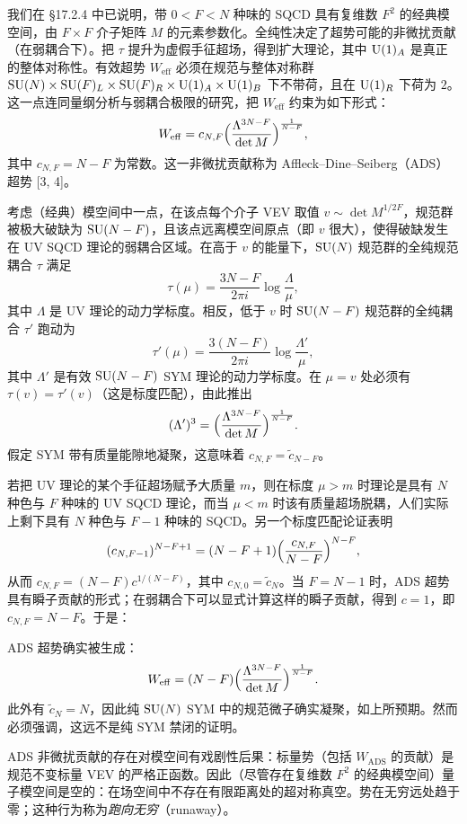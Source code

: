 我们在 §17.2.4 中已说明，带 $0<F<N$ 种味的 SQCD 具有复维数 $F^2$ 的经典模空间，由 $F\times F$ 介子矩阵 $M$ 的元素参数化。全纯性决定了超势可能的非微扰贡献（在弱耦合下）。把 $\tau$ 提升为虚假手征超场，得到扩大理论，其中 $\operatorname{U}(1)_A$ 是真正的整体对称性。有效超势 $W_{\mathrm{eff}}$ 必须在规范与整体对称群 $\operatorname{SU}(N)\times\operatorname{SU}(F)_L\times\operatorname{SU}(F)_R\times\operatorname{U}(1)_A\times\operatorname{U}(1)_B$ 下不带荷，且在 $\operatorname{U}(1)_R$ 下荷为 $2$。这一点连同量纲分析与弱耦合极限的研究，把 $W_{\mathrm{eff}}$ 约束为如下形式：
\[
W_{\mathrm{eff}}=c_{N,F}\Bigl(\frac{\Lambda^{3N-F}}{\det M}\Bigr)^{\frac{1}{N-F}},
\]
其中 $c_{N,F}=N-F$ 为常数。这一非微扰贡献称为 Affleck--Dine--Seiberg（ADS）超势 [3, 4]。

考虑（经典）模空间中一点，在该点每个介子 VEV 取值 $v\sim\det M^{1/2F}$，规范群被极大破缺为 $\operatorname{SU}(N-F)$，且该点远离模空间原点（即 $v$ 很大），使得破缺发生在 UV SQCD 理论的弱耦合区域。在高于 $v$ 的能量下，$\operatorname{SU}(N)$ 规范群的全纯规范耦合 $\tau$ 满足
\[
\tau(\mu)=\frac{3N-F}{2\pi i}\log\frac{\Lambda}{\mu},
\]
其中 $\Lambda$ 是 UV 理论的动力学标度。相反，低于 $v$ 时 $\operatorname{SU}(N-F)$ 规范群的全纯耦合 $\tau'$ 跑动为
\[
\tau'(\mu)=\frac{3(N-F)}{2\pi i}\log\frac{\Lambda'}{\mu},
\]
其中 $\Lambda'$ 是有效 $\operatorname{SU}(N-F)$ SYM 理论的动力学标度。在 $\mu=v$ 处必须有 $\tau(v)=\tau'(v)$（这是标度匹配），由此推出
\[
(\Lambda')^3=\Bigl(\frac{\Lambda^{3N-F}}{\det M}\Bigr)^{\frac{1}{N-F}}.
\]
假定 SYM 带有质量能隙地凝聚，这意味着 $c_{N,F}=\tilde c_{N-F}$。

若把 UV 理论的某个手征超场赋予大质量 $m$，则在标度 $\mu>m$ 时理论是具有 $N$ 种色与 $F$ 种味的 UV SQCD 理论，而当 $\mu<m$ 时该有质量超场脱耦，人们实际上剩下具有 $N$ 种色与 $F-1$ 种味的 SQCD。另一个标度匹配论证表明
\[
(c_{N,F-1})^{N-F+1}=(N-F+1)\Bigl(\frac{c_{N,F}}{N-F}\Bigr)^{N-F},
\]
从而 $c_{N,F}=(N-F)c^{1/(N-F)}$，其中 $c_{N,0}=\tilde c_N$。当 $F=N-1$ 时，ADS 超势具有瞬子贡献的形式；在弱耦合下可以显式计算这样的瞬子贡献，得到 $c=1$，即 $c_{N,F}=N-F$。于是：

\begin{proposition}[17.48]
ADS 超势确实被生成：
\[
W_{\mathrm{eff}}=(N-F)\Bigl(\frac{\Lambda^{3N-F}}{\det M}\Bigr)^{\frac{1}{N-F}}.
\]
此外有 $\tilde c_N=N$，因此纯 $\operatorname{SU}(N)$ SYM 中的规范微子确实凝聚，如上所预期。然而必须强调，这远不是纯 SYM 禁闭的证明。
\end{proposition}

\begin{remark}[17.49]
ADS 非微扰贡献的存在对模空间有戏剧性后果：标量势（包括 $W_{\mathrm{ADS}}$ 的贡献）是规范不变标量 VEV 的严格正函数。因此（尽管存在复维数 $F^2$ 的经典模空间）量子模空间是空的：在场空间中不存在有限距离处的超对称真空。势在无穷远处趋于零；这种行为称为\emph{跑向无穷}（runaway）。
\end{remark}

